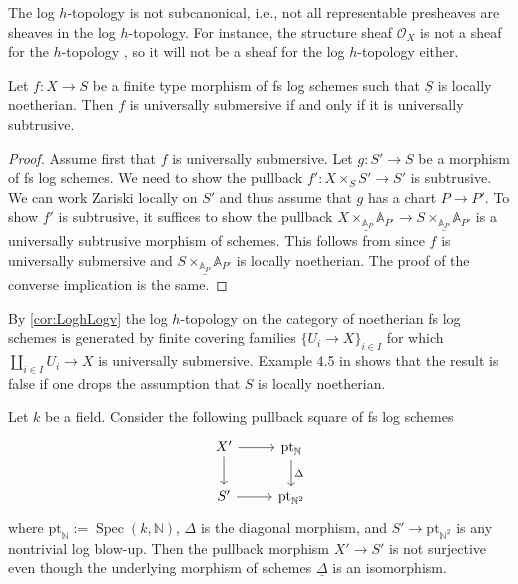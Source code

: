 \documentclass[10pt]{amsart}
\newcommand{\A}{\mathbb{A}}
\newcommand{\N}{\mathbb{N}}
\DeclareMathOperator{\Spec}{Spec}
\newcommand{\ul}{\underline}
\newcommand{\pt}{\mathrm{pt}}
\begin{document}
\begin{remark}
The log $h$-topology is not subcanonical, i.e., not all representable presheaves are sheaves in the log $h$-topology. For instance, the structure sheaf $\mathcal{O}_X$ is not a sheaf for the $h$-topology \cite[Tag 0EV0]{stacks-project}, so it will not be a sheaf for the log $h$-topology either.
\end{remark}

\begin{proposition}\label{cor:LoghLogv}
Let $f \colon X \to S$ be a finite type morphism of fs log schemes such that $\ul{S}$ is locally noetherian.
Then $f$ is universally submersive if and only if it is universally subtrusive.
\end{proposition}
\begin{proof}
Assume first that $f$ is universally submersive.
Let $g\colon S'\to S$ be a morphism of fs log schemes.
We need to show the pullback $f'\colon X\times_S S'\to S'$ is subtrusive.
We can work Zariski locally on $S'$ and thus assume that $g$ has a chart $P\to P'$.
To show $f'$ is subtrusive, 
it suffices to show the pullback $\ul{X\times_{\A_P} \A_{P'}}\to \ul{S\times_{\A_P} \A_{P'}}$ 
is a universally subtrusive morphism of schemes.
This follows from \cite[Corollary 2.10]{Rydh} since $f$ is universally submersive and 
$\ul{S\times_{\A_P} \A_{P'}}$ is locally noetherian.
The proof of the converse implication is the same.
\end{proof}

\begin{remark}
By \cref{cor:LoghLogv} the log $h$-topology on the category of noetherian fs log schemes is generated 
by finite covering families $\{U_i\to X\}_{i\in I}$ for which $\amalg_{i\in I} U_i\to X$ is universally 
submersive.
Example 4.5 in 
\cite{Rydh} shows that the result is false if one drops the assumption that 
$S$ is locally noetherian.
\end{remark}


\begin{example}\label{example:surjectivebutnotuniversally}
Let $k$ be a field.
Consider the following pullback square of fs log schemes
\[
\begin{tikzcd}
X' \ar[r] \ar[d] & \pt_{\N} \ar[d,"\Delta"] \\
S' \ar[r] & \pt_{\N^2}
\end{tikzcd}
\]
where $\pt_\N:=\Spec{(k,\N)}$, $\Delta$ is the diagonal morphism, and $S' \to \pt_{\N^2}$ is any nontrivial log blow-up. Then the pullback morphism $X' \to S'$ is not surjective even though the underlying morphism of schemes $\ul{\Delta}$ is an isomorphism.
\end{example}
\end{document}
